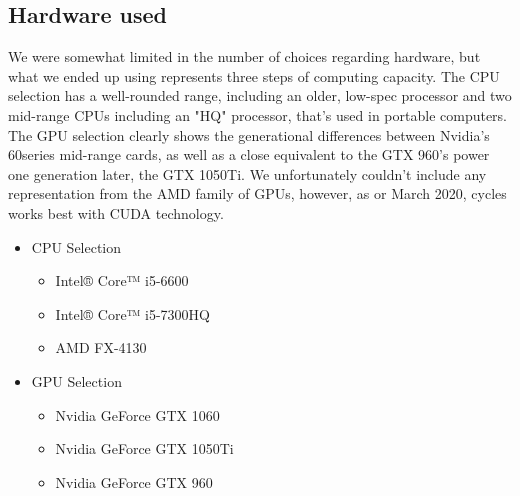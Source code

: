 \documentclass[conference]{IEEEtran}
\begin{document}
\subsection{Hardware used}
    We were somewhat limited in the number of choices regarding hardware, but what we ended up using represents three steps of computing capacity. The CPU selection has a well-rounded range, including an older, low-spec processor and two mid-range CPUs including an "HQ" processor, that's used in portable computers. The GPU selection clearly shows the generational differences between Nvidia's 60series mid-range cards, as well as a close equivalent to the GTX 960's power one generation later, the GTX 1050Ti. We unfortunately couldn't include any representation from the AMD family of GPUs, however, as or March 2020, cycles works best with CUDA technology.\\


\begin{itemize}
    \item CPU Selection
    \begin{itemize}
        \item Intel® Core™ i5-6600
        \item Intel® Core™ i5-7300HQ
        \item AMD FX-4130\\
    \end{itemize}
\end{itemize}

\begin{itemize}
    \item GPU Selection
    \begin{itemize}
        \item Nvidia GeForce GTX 1060
        \item Nvidia GeForce GTX 1050Ti
        \item Nvidia GeForce GTX 960\\
    \end{itemize}
\end{itemize}
\end{document}
